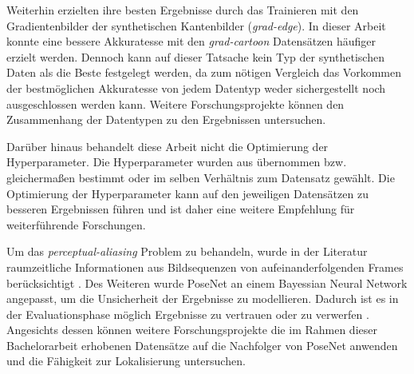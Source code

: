 Weiterhin erzielten \citet{acharyaBIMPoseNetIndoorCamera2019} ihre besten Ergebnisse durch das Trainieren mit den Gradientenbilder der synthetischen Kantenbilder (\textit{grad-edge}). In dieser Arbeit konnte eine bessere Akkuratesse mit den \textit{grad-cartoon} Datensätzen häufiger erzielt werden. Dennoch kann auf dieser Tatsache kein Typ der synthetischen Daten als die Beste festgelegt werden, da zum nötigen Vergleich das Vorkommen der bestmöglichen Akkuratesse von jedem Datentyp weder sichergestellt noch ausgeschlossen werden kann. Weitere Forschungsprojekte können den Zusammenhang der Datentypen zu den Ergebnissen untersuchen.


Darüber hinaus behandelt diese Arbeit nicht die Optimierung der Hyperparameter. Die Hyperparameter wurden aus \citet{acharyaBIMPoseNetIndoorCamera2019} übernommen bzw. gleichermaßen bestimmt oder im selben Verhältnis zum Datensatz gewählt. Die Optimierung der Hyperparameter kann auf den jeweiligen Datensätzen zu besseren Ergebnissen führen und ist daher eine weitere Empfehlung für weiterführende Forschungen. 

Um das \textit{perceptual-aliasing} Problem zu behandeln, wurde in der Literatur raumzeitliche Informationen aus Bildsequenzen von aufeinanderfolgenden Frames berücksichtigt \cite{walchImageBasedLocalizationUsing2017, clarkVidLocDeepSpatioTemporal2017}. Des Weiteren wurde PoseNet an einem Bayessian Neural Network angepasst, um die Unsicherheit der Ergebnisse zu modellieren. Dadurch ist es in der Evaluationsphase möglich Ergebnisse zu vertrauen oder zu verwerfen \cite{kendallModellingUncertaintyDeep2016}. Angesichts dessen können weitere Forschungsprojekte die im Rahmen dieser Bachelorarbeit erhobenen Datensätze auf die Nachfolger von PoseNet \cite{kendallModellingUncertaintyDeep2016, walchImageBasedLocalizationUsing2017, clarkVidLocDeepSpatioTemporal2017} anwenden und die Fähigkeit zur Lokalisierung untersuchen.